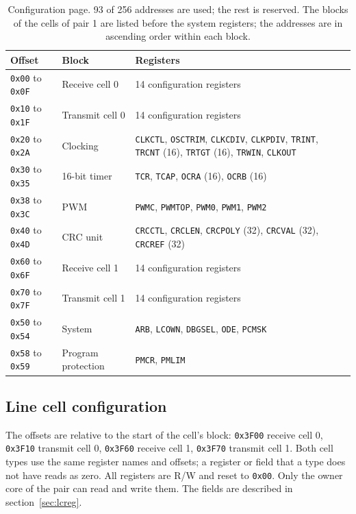 \documentclass[10pt,a4paper]{article}
\newcommand{\reg}[1]{\texttt{#1}}
\begin{document}
\begin{table}[H]
\centering\small
\begin{tabularx}{\linewidth}{@{}llL@{}}
\toprule
Offset & Block & Registers \\
\midrule
\texttt{0x00} to \texttt{0x0F} & Receive cell 0 & 14 configuration registers \\
\texttt{0x10} to \texttt{0x1F} & Transmit cell 0 & 14 configuration registers \\
\texttt{0x20} to \texttt{0x2A} & Clocking & \reg{CLKCTL}, \reg{OSCTRIM}, \reg{CLKCDIV}, \reg{CLKPDIV}, \reg{TRINT}, \reg{TRCNT} (16), \reg{TRTGT} (16), \reg{TRWIN}, \reg{CLKOUT} \\
\texttt{0x30} to \texttt{0x35} & 16-bit timer & \reg{TCR}, \reg{TCAP}, \reg{OCRA} (16), \reg{OCRB} (16) \\
\texttt{0x38} to \texttt{0x3C} & PWM & \reg{PWMC}, \reg{PWMTOP}, \reg{PWM0}, \reg{PWM1}, \reg{PWM2} \\
\texttt{0x40} to \texttt{0x4D} & CRC unit & \reg{CRCCTL}, \reg{CRCLEN}, \reg{CRCPOLY} (32), \reg{CRCVAL} (32), \reg{CRCREF} (32) \\
\texttt{0x60} to \texttt{0x6F} & Receive cell 1 & 14 configuration registers \\
\texttt{0x70} to \texttt{0x7F} & Transmit cell 1 & 14 configuration registers \\
\texttt{0x50} to \texttt{0x54} & System & \reg{ARB}, \reg{LCOWN}, \reg{DBGSEL}, \reg{ODE}, \reg{PCMSK} \\
\texttt{0x58} to \texttt{0x59} & Program protection & \reg{PMCR}, \reg{PMLIM} \\
\bottomrule
\end{tabularx}
\caption{Configuration page. 93 of 256 addresses are used; the rest is reserved. The blocks of the cells of pair 1 are listed before the system registers; the addresses are in ascending order within each block.}
\end{table}

\subsection{Line cell configuration}

The offsets are relative to the start of the cell's block: \texttt{0x3F00} receive cell 0, \texttt{0x3F10}
transmit cell 0, \texttt{0x3F60} receive cell 1, \texttt{0x3F70} transmit cell 1. Both cell types use the same
register names and offsets; a register or field that a type does not have reads as zero. All registers are R/W
and reset to \texttt{0x00}. Only the owner core of the pair can read and write them. The fields are described in
section~\ref{sec:lcreg}.
\end{document}
